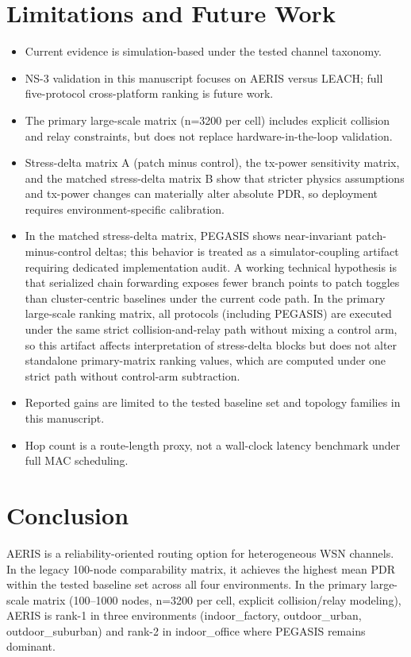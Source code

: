 ﻿\documentclass[sensors,article,submit,moreauthors,pdftex]{Definitions/mdpi}
\begin{document}
\section{Limitations and Future Work}
\begin{itemize}
\item Current evidence is simulation-based under the tested channel taxonomy.
\item NS-3 validation in this manuscript focuses on AERIS versus LEACH; full five-protocol cross-platform ranking is future work.
\item The primary large-scale matrix (n=3200 per cell) includes explicit collision and relay constraints, but does not replace hardware-in-the-loop validation.
\item Stress-delta matrix A (patch minus control), the tx-power sensitivity matrix, and the matched stress-delta matrix B show that stricter physics assumptions and tx-power changes can materially alter absolute PDR, so deployment requires environment-specific calibration.
\item In the matched stress-delta matrix, PEGASIS shows near-invariant patch-minus-control deltas; this behavior is treated as a simulator-coupling artifact requiring dedicated implementation audit. A working technical hypothesis is that serialized chain forwarding exposes fewer branch points to patch toggles than cluster-centric baselines under the current code path. In the primary large-scale ranking matrix, all protocols (including PEGASIS) are executed under the same strict collision-and-relay path without mixing a control arm, so this artifact affects interpretation of stress-delta blocks but does not alter standalone primary-matrix ranking values, which are computed under one strict path without control-arm subtraction.
\item Reported gains are limited to the tested baseline set and topology families in this manuscript.
\item Hop count is a route-length proxy, not a wall-clock latency benchmark under full MAC scheduling.
\end{itemize}

\section{Conclusion}
AERIS is a reliability-oriented routing option for heterogeneous WSN channels. In the legacy 100-node comparability matrix, it achieves the highest mean PDR within the tested baseline set across all four environments. In the primary large-scale matrix (100--1000 nodes, n=3200 per cell, explicit collision/relay modeling), AERIS is rank-1 in three environments (indoor\_factory, outdoor\_urban, outdoor\_suburban) and rank-2 in indoor\_office where PEGASIS remains dominant.
\end{document}

